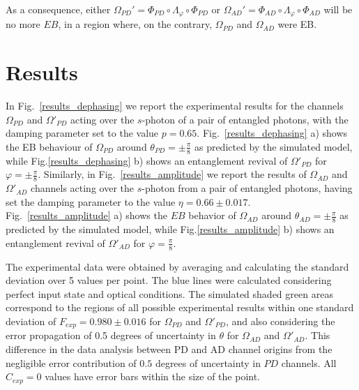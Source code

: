 \documentclass[aps,twocolumn,pra,superscriptaddress,showpacs,showkeys,floatfix]{revtex4-1}
\begin{document}
As a consequence, either $\Omega_{PD}'  =\Phi_{PD} \circ \Lambda_{\varphi} \circ \Phi_{PD}$ or $\Omega_{AD}' =\Phi_{AD} \circ \Lambda_{\varphi} \circ \Phi_{AD}$ will be no more $EB$, in a region where, on the contrary, $\Omega_{PD}$ and $\Omega_{AD}$ were EB.

\section{Results}

In Fig.~\ref{results_dephasing} we report the experimental results  for the channels $\Omega_{PD}$ and $\Omega'_{PD}$ acting over the $s$-photon of  a pair of entangled photons, with the damping parameter set to the value $p=0.65$. Fig.~\ref{results_dephasing} a) shows the EB behaviour of $\Omega_{PD}$ around $\theta_{PD}=\pm\tfrac{\pi}{8}$ as predicted by the simulated model, while Fig.\ref{results_dephasing} b) shows an entanglement revival of $\Omega'_{PD}$ for $\varphi=\pm\tfrac{\pi}{8}$.
Similarly, in Fig.~\ref{results_amplitude} we report the results of $\Omega_{AD}$ and $\Omega'_{AD}$ channels acting over the $s$-photon from a pair of entangled photons, having set the damping parameter to the value $\eta=0.66\pm0.017$. Fig.~\ref{results_amplitude} a) shows the $EB$ behavior of $\Omega_{AD}$ around $\theta_{AD}=\pm\tfrac{\pi}{8}$ as predicted by the simulated model, while Fig.\ref{results_amplitude} b) shows an entanglement revival of $\Omega'_{AD}$ for $\varphi=\tfrac{\pi}{8}$. 

The experimental data were obtained by averaging and calculating the standard deviation over 5 values per point. The blue lines were calculated considering perfect input state and optical conditions. The simulated shaded green areas correspond to the regions of all possible experimental results within one standard deviation of $F_{exp}=0.980\pm0.016$ for $\Omega_{PD}$ and $\Omega'_{PD}$, and also considering the error propagation of 0.5 degrees of uncertainty in $\theta$ for $\Omega_{AD}$ and $\Omega'_{AD}$. This difference in the data analysis between PD and AD channel origins from the negligible error contribution of $0.5$ degrees of uncertainty in $PD$ channels. All $C_{exp}=0$ values have error bars within the size of the point.
\end{document}
